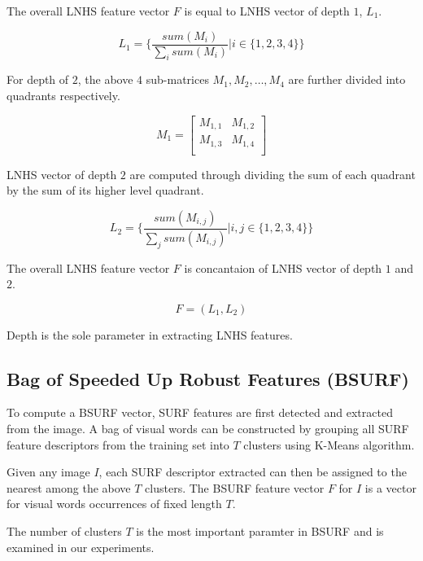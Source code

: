 The overall LNHS feature vector $F$ is equal to LNHS vector of depth $1$, $L_1$.

\begin{equation}
L_1 = \{\frac{sum(M_i)}{\sum_i sum(M_i)} | i \in \{1, 2, 3, 4\} \}
\end{equation}


For depth of $2$, the above $4$ sub-matrices $M_{1}, M_{2}, \dots, M_{4}$ are further divided into quadrants respectively.

\begin{equation}
M_{1} = 
\begin{bmatrix}
  M_{1,1}&  M_{1,2}\\
  M_{1,3}&  M_{1,4}\\
\end{bmatrix}
\end{equation}

LNHS vector of depth $2$ are computed through dividing the sum of each quadrant by the sum of its higher level quadrant.

\begin{equation}
L_2 = \{\frac{sum(M_{i,j})}{\sum_j sum(M_{i,j})} | i,j \in \{1, 2, 3, 4\}\}
\end{equation}

The overall LNHS feature vector $F$ is concantaion of LNHS vector of depth $1$ and $2$.

\begin{equation}
F = (L_1, L_2)
\end{equation}

Depth is the sole parameter in extracting LNHS features.

\subsection{Bag of Speeded Up Robust Features (BSURF)}
To compute a BSURF vector, SURF features \citep{bay2006surf} are first detected and extracted from the image.
A bag of visual words can be constructed by grouping all SURF feature descriptors from the training set into $T$ clusters using K-Means algorithm.

Given any image $I$, each SURF descriptor extracted can then be assigned to the nearest among the above $T$ clusters.
The BSURF feature vector $F$ for $I$ is a vector for visual words occurrences of fixed length $T$.

The number of clusters $T$ is the most important paramter in BSURF and is examined in our experiments.




